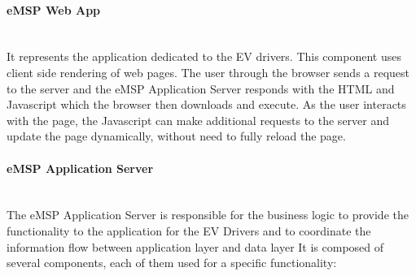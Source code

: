 \paragraph*{eMSP Web App} \hfill \\
It represents the application dedicated to the EV drivers. This component uses client side rendering of web pages.
The user through the browser sends a request to the server and the eMSP Application Server responds with the HTML and Javascript which the browser then
downloads and execute. As the user interacts with the page, the Javascript can make additional requests to the server and update
the page dynamically, without need to fully reload the page.
\paragraph*{eMSP Application Server} \hfill \\
The eMSP Application Server is responsible for the business logic to provide the functionality to the application for the EV Drivers and to coordinate the information flow between application layer and data layer
It is composed of several components, each of them used for a specific functionality:\\
